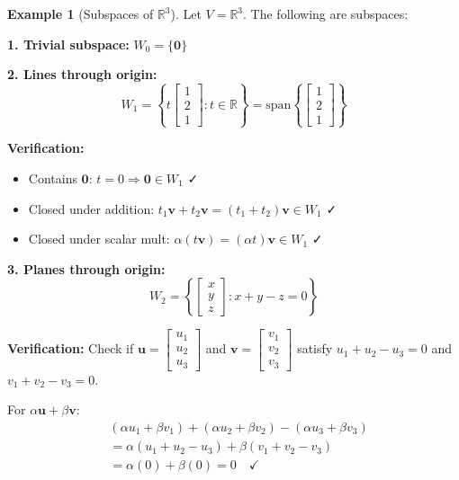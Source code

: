 \documentclass[12pt,a4paper]{article}
\theoremstyle{definition}
\newtheorem{example}{Example}[section]
\begin{document}
\begin{example}[Subspaces of $\mathbb{R}^3$]
Let $V = \mathbb{R}^3$. The following are subspaces:

\textbf{1. Trivial subspace:} $W_0 = \{\mathbf{0}\}$

\textbf{2. Lines through origin:}
\begin{equation}
W_1 = \left\{t\begin{bmatrix} 1 \\ 2 \\ 1 \end{bmatrix} : t \in \mathbb{R}\right\} = \text{span}\left\{\begin{bmatrix} 1 \\ 2 \\ 1 \end{bmatrix}\right\}
\end{equation}

\textbf{Verification:}
\begin{itemize}
    \item Contains $\mathbf{0}$: $t = 0 \Rightarrow \mathbf{0} \in W_1$ ✓
    \item Closed under addition: $t_1\mathbf{v} + t_2\mathbf{v} = (t_1 + t_2)\mathbf{v} \in W_1$ ✓
    \item Closed under scalar mult: $\alpha(t\mathbf{v}) = (\alpha t)\mathbf{v} \in W_1$ ✓
\end{itemize}

\textbf{3. Planes through origin:}
\begin{equation}
W_2 = \left\{\begin{bmatrix} x \\ y \\ z \end{bmatrix} : x + y - z = 0\right\}
\end{equation}

\textbf{Verification:}
Check if $\mathbf{u} = \begin{bmatrix} u_1 \\ u_2 \\ u_3 \end{bmatrix}$ and $\mathbf{v} = \begin{bmatrix} v_1 \\ v_2 \\ v_3 \end{bmatrix}$ satisfy $u_1 + u_2 - u_3 = 0$ and $v_1 + v_2 - v_3 = 0$.

For $\alpha\mathbf{u} + \beta\mathbf{v}$:
\begin{align}
&(\alpha u_1 + \beta v_1) + (\alpha u_2 + \beta v_2) - (\alpha u_3 + \beta v_3) \\
&= \alpha(u_1 + u_2 - u_3) + \beta(v_1 + v_2 - v_3) \\
&= \alpha(0) + \beta(0) = 0 \quad ✓
\end{align}


\end{example}
\end{document}
